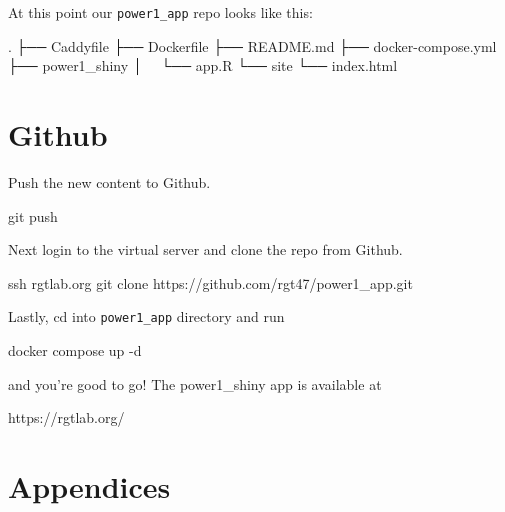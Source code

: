 \documentclass[
  letterpaper,
  DIV=11,
  numbers=noendperiod,
  oneside]{scrartcl}
\newenvironment{Shaded}{\begin{snugshade}}{\end{snugshade}}
\newcommand{\AttributeTok}[1]{\textcolor[rgb]{0.40,0.45,0.13}{#1}}
\newcommand{\ExtensionTok}[1]{\textcolor[rgb]{0.00,0.23,0.31}{#1}}
\newcommand{\FunctionTok}[1]{\textcolor[rgb]{0.28,0.35,0.67}{#1}}
\newcommand{\NormalTok}[1]{\textcolor[rgb]{0.00,0.23,0.31}{#1}}
\begin{document}
At this point our \texttt{power1\_app} repo looks like this:

\begin{Shaded}
\begin{Highlighting}[]
\NormalTok{.}
\NormalTok{├── Caddyfile}
\NormalTok{├── Dockerfile}
\NormalTok{├── README.md}
\NormalTok{├── docker{-}compose.yml}
\NormalTok{├── power1\_shiny}
\NormalTok{│   └── app.R}
\NormalTok{└── site}
\NormalTok{    └── index.html}
\end{Highlighting}
\end{Shaded}

\hypertarget{github}{%
\section{Github}\label{github}}

Push the new content to Github.

\begin{Shaded}
\begin{Highlighting}[]
\FunctionTok{git}\NormalTok{ push}
\end{Highlighting}
\end{Shaded}

Next login to the virtual server and clone the repo from Github.

\begin{Shaded}
\begin{Highlighting}[]
\FunctionTok{ssh}\NormalTok{ rgtlab.org}
\FunctionTok{git}\NormalTok{ clone https://github.com/rgt47/power1\_app.git}
\end{Highlighting}
\end{Shaded}

Lastly, cd into \texttt{power1\_app} directory and run

\begin{Shaded}
\begin{Highlighting}[]
\ExtensionTok{docker}\NormalTok{ compose up }\AttributeTok{{-}d}
\end{Highlighting}
\end{Shaded}

and you're good to go! The power1\_shiny app is available at

\begin{Shaded}
\begin{Highlighting}[]
\ExtensionTok{https://rgtlab.org/}
\end{Highlighting}
\end{Shaded}

\hypertarget{appendices}{%
\section{Appendices}\label{appendices}}
\end{document}
